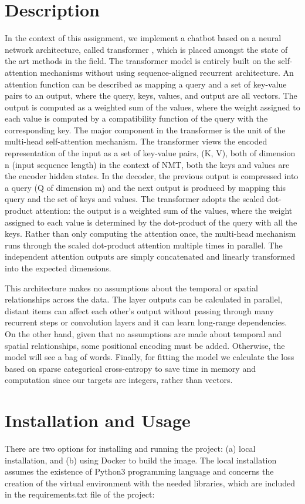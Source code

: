 \documentclass[10pt, twocolumn, a4paper]{article}
\begin{document}
\section{Description}
In the context of this assignment, we implement a chatbot based on a neural network architecture, called transformer \cite{Transformer}, which is placed amongst the state of the art methods in the field. The transformer model is entirely built on the self-attention mechanisms without using sequence-aligned recurrent architecture. An attention function can be described as mapping a query and a set of key-value pairs to an output, where the query, keys, values, and output are all vectors. The output is computed as a weighted sum of the values, where the weight assigned to each value is computed by a compatibility function of the query with the corresponding key. The major component in the transformer is the unit of the multi-head self-attention mechanism. The transformer views the encoded representation of the input as a set of key-value pairs, (K, V), both of dimension n (input sequence length) in the context of NMT, both the keys and values are the encoder hidden states. In the decoder, the previous output is compressed into a query (Q of dimension m) and the next output is produced by mapping this query and the set of keys and values. The transformer adopts the scaled dot-product attention: the output is a weighted sum of the values, where the weight assigned to each value is determined by the dot-product of the query with all the keys. Rather than only computing the attention once, the multi-head mechanism runs through the scaled dot-product attention multiple times in parallel. The independent attention outputs are simply concatenated and linearly transformed into the expected dimensions.

This architecture makes no assumptions about the temporal or spatial relationships across the data. The layer outputs can be calculated in parallel, distant items can affect each other’s output without passing through many recurrent steps or convolution layers and it can learn long-range dependencies. On the other hand, given that no assumptions are made about temporal and spatial relationships, some positional encoding must be added. Otherwise, the model will see a bag of words. Finally, for fitting the model we calculate the loss based on sparse categorical cross-entropy to save time in memory and computation since our targets are integers, rather than vectors.

\section{Installation and Usage}
There are two options for installing and running the project: (a) local installation, and (b) using Docker to build the image. The local installation assumes the existence of Python3 programming language and concerns the creation of the virtual environment with the needed libraries, which are included in the requirements.txt file of the project:
\end{document}
